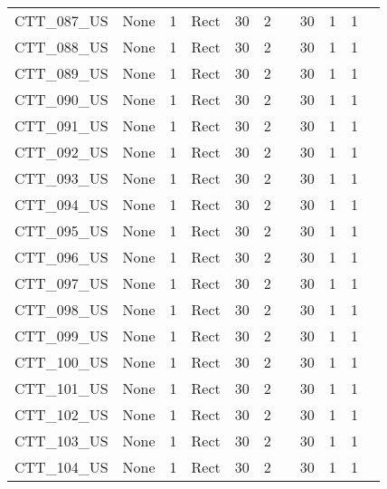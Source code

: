\begin{table}[]
\begin{tabular}{@{}lcccccccccc@{}}
CTT\_087\_US  & None       & 1        & Rect & 30     & 2     &          & 30     & 1         & 1          \\
CTT\_088\_US  & None       & 1        & Rect & 30     & 2     &          & 30     & 1         & 1          \\
CTT\_089\_US  & None       & 1        & Rect & 30     & 2     &          & 30     & 1         & 1          \\
CTT\_090\_US  & None       & 1        & Rect & 30     & 2     &          & 30     & 1         & 1          \\
CTT\_091\_US  & None       & 1        & Rect & 30     & 2     &          & 30     & 1         & 1          \\
CTT\_092\_US  & None       & 1        & Rect & 30     & 2     &          & 30     & 1         & 1          \\
CTT\_093\_US  & None       & 1        & Rect & 30     & 2     &          & 30     & 1         & 1          \\
CTT\_094\_US  & None       & 1        & Rect & 30     & 2     &          & 30     & 1         & 1          \\
CTT\_095\_US  & None       & 1        & Rect & 30     & 2     &          & 30     & 1         & 1          \\
CTT\_096\_US  & None       & 1        & Rect & 30     & 2     &          & 30     & 1         & 1          \\
CTT\_097\_US  & None       & 1        & Rect & 30     & 2     &          & 30     & 1         & 1          \\
CTT\_098\_US  & None       & 1        & Rect & 30     & 2     &          & 30     & 1         & 1          \\
CTT\_099\_US  & None       & 1        & Rect & 30     & 2     &          & 30     & 1         & 1          \\
CTT\_100\_US  & None       & 1        & Rect & 30     & 2     &          & 30     & 1         & 1          \\
CTT\_101\_US  & None       & 1        & Rect & 30     & 2     &          & 30     & 1         & 1          \\
CTT\_102\_US  & None       & 1        & Rect & 30     & 2     &          & 30     & 1         & 1          \\
CTT\_103\_US  & None       & 1        & Rect & 30     & 2     &          & 30     & 1         & 1          \\
CTT\_104\_US  & None       & 1        & Rect & 30     & 2     &          & 30     & 1         & 1          \\

\end{tabular}
\end{table}
